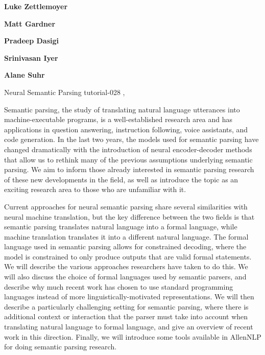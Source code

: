 \begin{bio}
  {\bfseries Luke Zettlemoyer} 

  {\bfseries Matt Gardner}
 
  {\bfseries Pradeep Dasigi}

  {\bfseries Srinivasan Iyer}

  {\bfseries Alane Suhr}

\end{bio}

\begin{tutorial}
  {Neural Semantic Parsing}
  {tutorial-028}
  {\daydateyear, \tutorialafternoontime}
  {\TutLocF}

Semantic parsing, the study of translating natural language utterances into machine-executable programs, is a well-established research area and has applications in question answering, instruction following, voice assistants, and code generation. In the last two years, the models used for semantic parsing have changed dramatically with the introduction of neural encoder-decoder methods that allow us to rethink many of the previous assumptions underlying semantic parsing. We aim to inform those already interested in semantic parsing research of these new developments in the field, as well as introduce the topic as an exciting research area to those who are unfamiliar with it.

Current approaches for neural semantic parsing share several similarities with neural machine translation, but the key difference between the two fields is that semantic parsing translates natural language into a formal language, while machine translation translates it into a different natural language. The formal language used in semantic parsing allows for constrained decoding, where the model is constrained to only produce outputs that are valid formal statements. We will describe the various approaches researchers have taken to do this. We will also discuss the choice of formal languages used by semantic parsers, and describe why much recent work has chosen to use standard programming languages instead of more linguistically-motivated representations. We will then describe a particularly challenging setting for semantic parsing, where there is additional context or interaction that the parser must take into account when translating natural language to formal language, and give an overview of recent work in this direction. Finally, we will introduce some tools available in AllenNLP for doing semantic parsing research.

\end{tutorial} 
